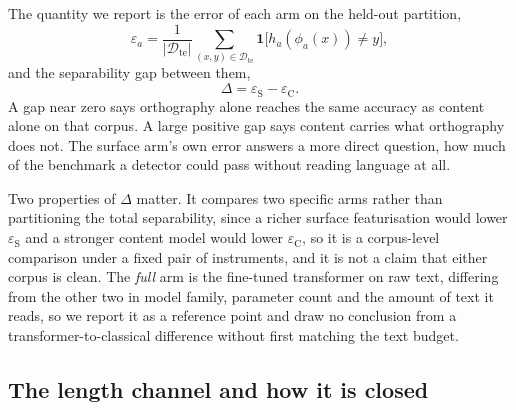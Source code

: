 \documentclass[conference,a4paper]{IEEEtran}
\begin{document}
The quantity we report is the error of each arm on the held-out partition,
\begin{equation}
\label{eq:err}
\varepsilon_{a}  =  \frac{1}{|\mathcal{D}_{\text{te}}|}\sum_{(x,y)\in\mathcal{D}_{\text{te}}} \mathbf{1}\big[h_{a}(\phi_{a}(x)) \neq y\big],
\end{equation}
and the separability gap between them,
\begin{equation}
\label{eq:gap}
\Delta  =  \varepsilon_{\mathrm{S}} - \varepsilon_{\mathrm{C}} .
\end{equation}
A gap near zero says orthography alone reaches the same accuracy as content alone on that corpus. A large positive gap says content carries what orthography does not. The surface arm's own error answers a more direct question, how much of the benchmark a detector could pass without reading language at all.

Two properties of $\Delta$ matter. It compares two specific arms rather than partitioning the total separability, since a richer surface featurisation would lower $\varepsilon_{\mathrm{S}}$ and a stronger content model would lower $\varepsilon_{\mathrm{C}}$, so it is a corpus-level comparison under a fixed pair of instruments, and it is not a claim that either corpus is clean. The \emph{full} arm is the fine-tuned transformer on raw text, differing from the other two in model family, parameter count and the amount of text it reads, so we report it as a reference point and draw no conclusion from a transformer-to-classical difference without first matching the text budget.

\subsection{The length channel and how it is closed}
\label{sec:lengthdef}
\end{document}
